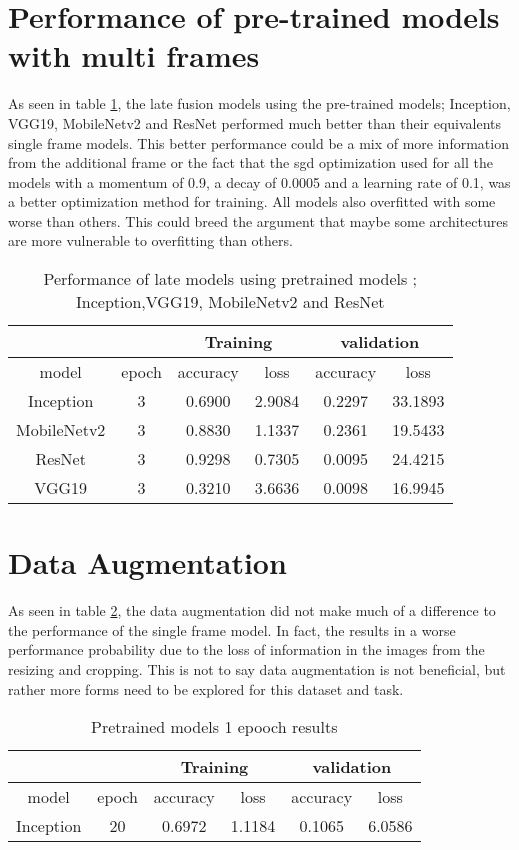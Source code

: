 \section{ Performance of pre-trained models with multi frames}
As seen in table \ref{pretrainedlate}, the late fusion models using the pre-trained models; Inception, VGG19,  MobileNetv2 and ResNet performed much better than their equivalents single frame models. This better performance could be a mix of more information from the additional frame or the fact that the sgd optimization used for all the models with a momentum of 0.9, a decay of 0.0005 and a learning rate of 0.1, was a better optimization method for training.  All models also overfitted with some worse than others.  This could breed the argument that maybe some architectures are more vulnerable to overfitting than others. 

\begin{table}[h!]
\centering
\begin{tabular}{ |c|c|c|c|c|c| } 
 \hline
  \multicolumn{2}{|c|}{ } &
 \multicolumn{2}{|c|}{Training } &
 \multicolumn{2}{|c|}{validation} \\
 \hline
 model & epoch & accuracy & loss & accuracy & loss \\ 
  \hline
   Inception & 3 & 0.6900 & 2.9084 & 0.2297 &33.1893 \\ 
    MobileNetv2 & 3 & 0.8830  & 1.1337 & 0.2361 & 19.5433\\
  ResNet & 3 & 0.9298  & 0.7305 & 0.0095 & 24.4215   \\ 
 VGG19 & 3 & 0.3210 & 3.6636 & 0.0098 & 16.9945 \\
 \hline
\end{tabular}
\caption{Performance of late models using pretrained models ; Inception,VGG19, MobileNetv2 and ResNet}
\label{pretrainedlate}
\end{table}

\section{ Data Augmentation}
As seen in table \ref{dataAug}, the data augmentation did not make much of a difference to the performance of the single frame model. In fact, the results in a worse performance probability due to the loss of information in the images from the resizing and cropping.  This is not to say data augmentation is not beneficial, but rather more forms need to be explored for this dataset and task. 

\begin{table}[h!]
\centering
\begin{tabular}{ |c|c|c|c|c|c| } 
 \hline
  \multicolumn{2}{|c|}{ } &
 \multicolumn{2}{|c|}{Training } &
 \multicolumn{2}{|c|}{validation} \\
 \hline
 model & epoch & accuracy & loss & accuracy & loss \\ 
  \hline
   Inception & 20 & 0.6972 & 1.1184 & 0.1065 &6.0586 \\ 
 \hline
\end{tabular}
\caption{Pretrained models 1 epooch results}
\label{dataAug}
\end{table}


